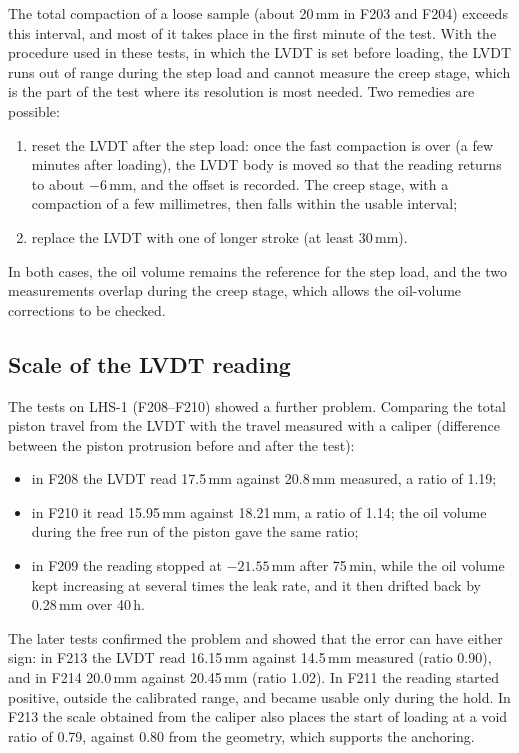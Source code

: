The total compaction of a loose sample (about 20\,mm in F203 and F204) exceeds this interval, and most of it takes place in the first minute of the test. With the procedure used in these tests, in which the LVDT is set before loading, the LVDT runs out of range during the step load and cannot measure the creep stage, which is the part of the test where its resolution is most needed. Two remedies are possible:
\begin{enumerate}
    \item reset the LVDT after the step load: once the fast compaction is over (a few minutes after loading), the LVDT body is moved so that the reading returns to about $-6$\,mm, and the offset is recorded. The creep stage, with a compaction of a few millimetres, then falls within the usable interval;
    \item replace the LVDT with one of longer stroke (at least 30\,mm).
\end{enumerate}
In both cases, the oil volume remains the reference for the step load, and the two measurements overlap during the creep stage, which allows the oil-volume corrections to be checked.

\subsection{Scale of the LVDT reading}

The tests on LHS-1 (F208--F210) showed a further problem. Comparing the total piston travel from the LVDT with the travel measured with a caliper (difference between the piston protrusion before and after the test):
\begin{itemize}
    \item in F208 the LVDT read 17.5\,mm against 20.8\,mm measured, a ratio of 1.19;
    \item in F210 it read 15.95\,mm against 18.21\,mm, a ratio of 1.14; the oil volume during the free run of the piston gave the same ratio;
    \item in F209 the reading stopped at $-21.55$\,mm after 75\,min, while the oil volume kept increasing at several times the leak rate, and it then drifted back by 0.28\,mm over 40\,h.
\end{itemize}
The later tests confirmed the problem and showed that the error can have either sign: in F213 the LVDT read 16.15\,mm against 14.5\,mm measured (ratio 0.90), and in F214 20.0\,mm against 20.45\,mm (ratio 1.02). In F211 the reading started positive, outside the calibrated range, and became usable only during the hold. In F213 the scale obtained from the caliper also places the start of loading at a void ratio of 0.79, against 0.80 from the geometry, which supports the anchoring.

